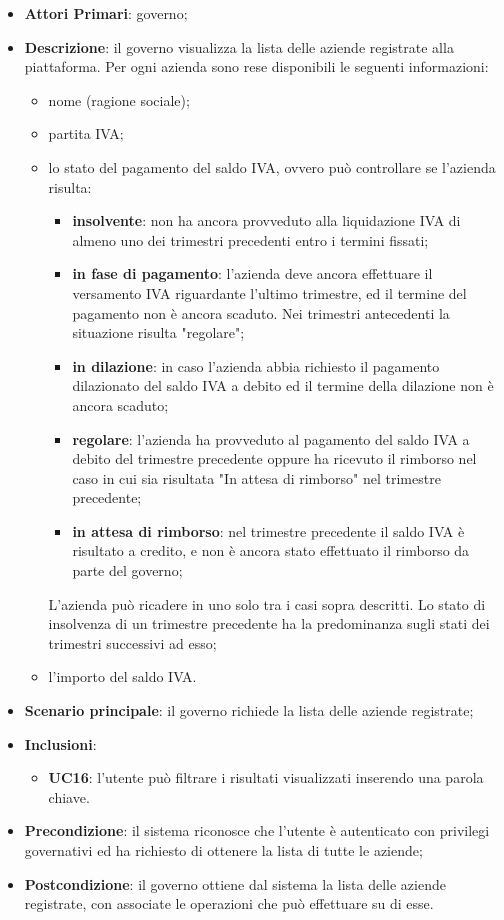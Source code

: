  \begin{itemize}
	\item \textbf{Attori Primari}: governo;
	\item \textbf{Descrizione}: il governo visualizza la lista delle aziende registrate alla piattaforma. Per ogni azienda sono rese disponibili le seguenti informazioni:
	\begin{itemize}
		\item nome (ragione sociale);
		\item partita IVA;
		\item lo stato del pagamento del saldo IVA, ovvero può controllare se l'azienda risulta:
		\begin{itemize}
			\item \textbf{insolvente}: non ha ancora provveduto alla liquidazione IVA di almeno uno dei trimestri precedenti entro i termini fissati;
			\item \textbf{in fase di pagamento}: l'azienda deve ancora effettuare il versamento IVA riguardante l'ultimo trimestre, ed il termine del pagamento non è ancora scaduto. Nei trimestri antecedenti la situazione risulta "regolare";
			\item \textbf{in dilazione}: in caso l'azienda abbia richiesto il pagamento dilazionato del saldo IVA a debito ed il termine della dilazione non è ancora scaduto;
			\item \textbf{regolare}: l'azienda ha provveduto al pagamento del saldo IVA a debito del trimestre precedente oppure ha ricevuto il rimborso nel caso in cui sia risultata "In attesa di rimborso" nel trimestre precedente;
			\item \textbf{in attesa di rimborso}: nel trimestre precedente il saldo IVA è risultato a credito, e non è ancora stato effettuato il rimborso da parte del governo;
		\end{itemize}
	L'azienda può ricadere in uno solo tra i casi sopra descritti. Lo stato di insolvenza di un trimestre precedente ha la predominanza sugli stati dei trimestri successivi ad esso;
		\item l'importo del saldo IVA.
	\end{itemize}
	
	\item \textbf{Scenario principale}: il governo richiede la lista delle aziende registrate;
	\item \textbf{Inclusioni}:
	\begin{itemize}
		\item \textbf{UC16}: l'utente può filtrare i risultati visualizzati inserendo una parola chiave.
	\end{itemize}
	\item \textbf{Precondizione}: il sistema riconosce che l'utente è autenticato con privilegi governativi ed ha richiesto di ottenere la lista di tutte le aziende;
	\item \textbf{Postcondizione}: il governo ottiene dal sistema la lista delle aziende registrate, con associate le operazioni che può effettuare su di esse.
\end{itemize}
